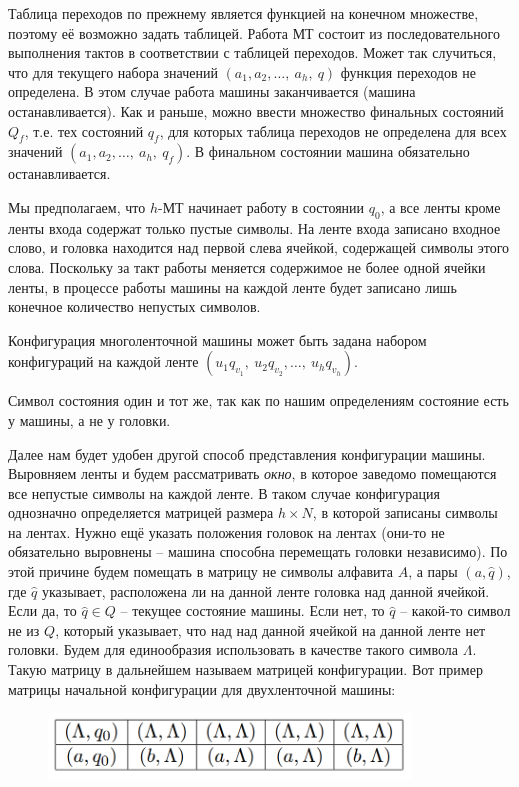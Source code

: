 \documentclass[a4paper, 12pt]{article}
\begin{document}
Таблица переходов по прежнему является функцией на конечном множестве, поэтому её возможно задать таблицей.
Работа МТ состоит из последовательного выполнения тактов в соответствии с таблицей переходов. Может так случиться, что для текущего набора значений $(a_1, a_2, \ldots ,\ a_h,\ q)$ функция переходов не определена. В этом случае работа машины заканчивается (машина останавливается). Как и раньше, можно ввести множество финальных состояний $Q_f$, т.е. тех состояний $q_f$, для которых таблица переходов не определена для всех значений $(a_1, a_2, \ldots ,\ a_h,\ q_f)$. В финальном состоянии машина обязательно останавливается.

Мы предполагаем, что $h$-МТ начинает работу в состоянии $q_0$, а все ленты кроме ленты входа содержат только пустые символы. На ленте входа записано входное слово, и головка находится над первой слева ячейкой, содержащей символы этого
слова. Поскольку за такт работы меняется содержимое не более одной ячейки ленты, в процессе работы машины на каждой ленте будет записано лишь конечное количество непустых символов.

Конфигурация многоленточной машины может быть задана набором конфигураций на каждой ленте $(u_1q_{v_1},\ u_2q_{v_2}, \ldots ,\ u_hq_{v_h})$.

Символ состояния один и тот же, так как по нашим определениям состояние есть у машины, а не у головки.

Далее нам будет удобен другой способ представления конфигурации машины. Выровняем ленты и будем рассматривать \textit{окно}, в которое заведомо помещаются все непустые символы на каждой ленте. В таком случае конфигурация однозначно определяется матрицей размера $h \times N$, в которой записаны символы на лентах. Нужно ещё указать положения головок на лентах (они-то не обязательно выровнены -- машина способна перемещать головки независимо). По этой причине будем помещать в матрицу не символы алфавита $A$, а пары $(a, \hat{q})$, где $\hat{q}$ указывает, расположена ли на данной ленте головка над данной ячейкой. Если да, то $\hat{q} \in Q$ -- текущее состояние машины. Если нет, то $\hat{q}$ -- какой-то символ не из $Q$, который указывает,
что над над данной ячейкой на данной ленте нет головки. Будем для единообразия использовать в качестве такого символа $\Lambda$. Такую матрицу в дальнейшем называем
матрицей конфигурации. Вот пример матрицы начальной конфигурации для двухленточной машины:

\begin{figure}[h]
\begin{center}
    \begin{minipage}[h]{0.6\linewidth}
        \includegraphics[height=1.75cm, width=\linewidth]{images/TabMT.png}
    \end{minipage}
\end{center}
\end{figure}
\end{document}
